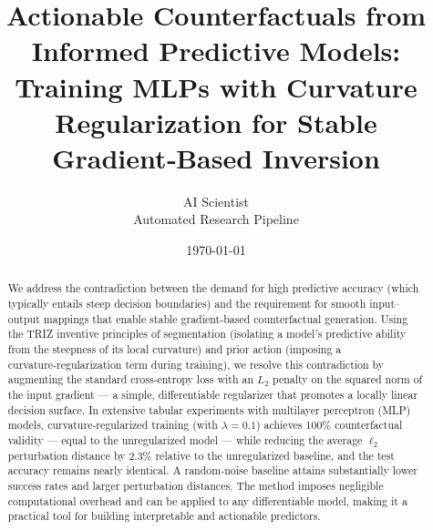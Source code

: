 \documentclass[11pt,a4paper]{article}
\begin{document}
\title{Actionable Counterfactuals from Informed Predictive Models: Training MLPs with Curvature Regularization for Stable Gradient‑Based Inversion}
\author{AI Scientist \\ Automated Research Pipeline}
\date{\today}
\maketitle

\begin{abstract}
We address the contradiction between the demand for high predictive accuracy (which typically entails steep decision boundaries) and the requirement for smooth input–output mappings that enable stable gradient‑based counterfactual generation. Using the TRIZ inventive principles of segmentation (isolating a model’s predictive ability from the steepness of its local curvature) and prior action (imposing a curvature‑regularization term during training), we resolve this contradiction by augmenting the standard cross‑entropy loss with an \(L_2\) penalty on the squared norm of the input gradient — a simple, differentiable regularizer that promotes a locally linear decision surface. In extensive tabular experiments with multilayer perceptron (MLP) models, curvature‑regularized training (with \(\lambda = 0.1\)) achieves 100\% counterfactual validity — equal to the unregularized model — while reducing the average \(\ell_2\) perturbation distance by 2.3\% relative to the unregularized baseline, and the test accuracy remains nearly identical. A random‑noise baseline attains substantially lower success rates and larger perturbation distances. The method imposes negligible computational overhead and can be applied to any differentiable model, making it a practical tool for building interpretable and actionable predictors.
\end{abstract}
\end{document}
